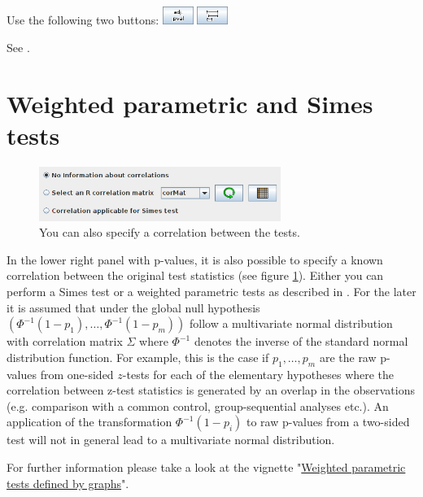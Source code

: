 \documentclass[a4paper, 10pt]{article}\usepackage[]{graphicx}\usepackage[]{color}
\numberwithin{equation}{section}
\theoremstyle{definition}
\theoremstyle{plain}
\begin{document}
Use the following two buttons:
\includegraphics[width=1cm]{pictures/adjPval_b.png}
\includegraphics[width=1cm]{pictures/confint2_b.png}

See \cite{Bretz11}.

\section{Weighted parametric and Simes
tests} 

\begin{figure}[ht]
  \centering    
  \includegraphics[width=0.7\textwidth]{pictures/correlated.png}      
  \caption{\label{fig:correlated} You can also specify a correlation between the tests.}
\end{figure}

In the lower right panel with p-values, it is also possible to specify a known
correlation between the original test statistics (see figure
\ref{fig:correlated}). Either you can perform a Simes test or a weighted parametric
tests as described in \cite{Bretz11}. For the later it is assumed that
under the global null hypothesis $(\Phi^{-1}(1-p_1),\ldots,\Phi^{-1}(1-p_m))$ 
follow a multivariate normal distribution with correlation matrix $\Sigma$ where
$\Phi^{-1}$ denotes the inverse of the standard normal
distribution function. For example, this is the case if $p_1,\ldots,
  p_m$ are the raw p-values from one-sided $z$-tests for each of the
elementary hypotheses where the correlation between z-test statistics
is generated by an overlap in the observations (e.g. comparison with a
common control, group-sequential analyses etc.). An application of the
transformation $\Phi^{-1}(1-p_i)$ to raw p-values from a two-sided
test will not in general lead to a multivariate normal
distribution.

For further information please take a look at the vignette
"\href{http://cran.r-project.org/web/packages/gMCP/vignettes/parametric.pdf}{Weighted
parametric tests defined by graphs}".
\end{document}
